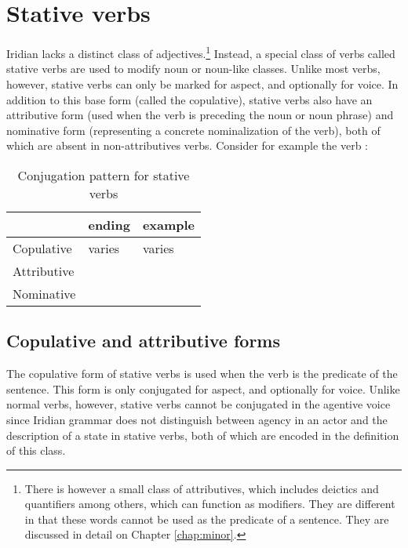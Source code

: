 \section{Stative verbs}\label{sec:statives}

Iridian lacks a distinct class of adjectives.\footnote{There is however a small class of attributives, which includes deictics and quantifiers among others, which can function as modifiers. They are different in that these words cannot be used as the predicate of a sentence. They are discussed in detail on Chapter \ref{chap:minor}.} Instead, a special class of verbs called {\sc stative verbs} are used to modify noun or noun-like classes. Unlike most verbs, however, stative verbs can only be marked for aspect, and optionally for voice. In addition to this base form (called the {\sc copulative}), stative verbs also have an {\sc attributive} form (used when the verb is preceding the noun or noun phrase) and {\sc nominative} form (representing a concrete nominalization of the verb), both of which are absent in non-attributives verbs. Consider for example the verb  :

\begin{table}[h!]
	\small
	\caption{Conjugation pattern for stative verbs}
	\medskip
	\begin{tabu} to 0.7\textwidth{YY[0.8]Y}
		\toprule
		&{\sc ending}&{\sc example}\\
		\midrule
		Copulative & varies & varies\\
		Attributive &  & \\
		Nominative & 	& \\
		\bottomrule
	\end{tabu}
\end{table}

\subsection{Copulative and attributive forms}
The copulative form of stative verbs is used when the verb is the predicate of the sentence. This form is only conjugated for aspect, and optionally for voice. Unlike normal verbs, however, stative verbs cannot be conjugated in the agentive voice since Iridian grammar does not distinguish between agency in an actor and the description of a state in stative verbs, both of which are encoded in the definition of this class. 

